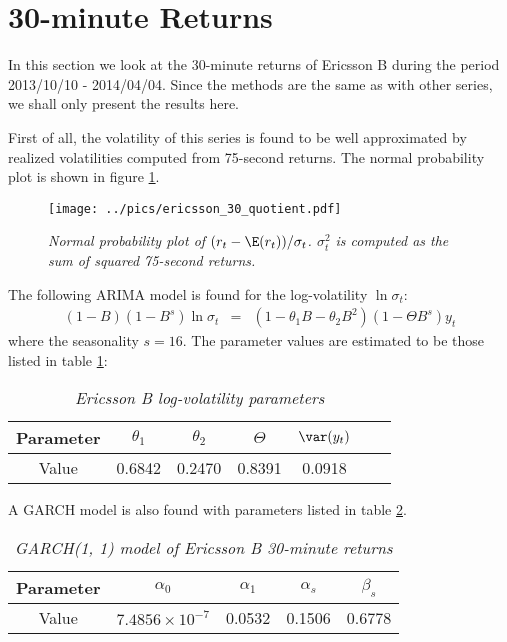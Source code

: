 \section{30-minute Returns}\label{sec:ericsson_30min}
In this section we look at the 30-minute returns of Ericsson B during
the period 2013/10/10 - 2014/04/04. Since the methods are the same as
with other series, we shall only present the results here.

First of all, the volatility of this series is found to be well
approximated by realized volatilities computed from 75-second
returns. The normal probability plot is shown in figure
\ref{fig:ericsson_30_quotient}.
\begin{figure}[htb!]
  \centering
  \texttt{[image: ../pics/ericsson\_30\_quotient.pdf]}
  \caption{\small \it Normal probability plot of $(r_t -\E(r_t))/
    \sigma_t$. $\sigma_t^2$ is computed as the sum of squared
    75-second returns.}
  \label{fig:ericsson_30_quotient}
\end{figure}
The following ARIMA model is found for the log-volatility $\ln
\sigma_t$:
\begin{eqnarray*}
  (1-B)(1-B^s) \ln\sigma_t &=& (1- \theta_1B - \theta_2B^2) (1 -
  \Theta B^s) y_t 
\end{eqnarray*}
where the seasonality $s = 16$. The parameter values are estimated to
be those listed in table
\ref{tab:ericsson_30_params}:
\begin{table}[htb!]
  \centering
  \begin{tabular}{|c|c|c|c|c|c|c|}
    \hline
    Parameter & $\theta_1$ & $\theta_2$ & $\Theta$ &
    $\var(y_t)$ \\
    \hline
    Value & 0.6842 & 0.2470 & 0.8391 & 0.0918 \\
    \hline
  \end{tabular}
  \caption{\small \it Ericsson B log-volatility parameters}
  \label{tab:ericsson_30_params}
\end{table}
A GARCH model is also found with parameters listed in table
\ref{tab:ericsson_30_garch_params}.
\begin{table}[htb!]
  \centering
  \begin{tabular}{|c|c|c|c|c|}
    \hline
    Parameter & $\alpha_0$ & $\alpha_1$ & $\alpha_{s}$ & $\beta_{s}$ \\
    \hline
    Value & $7.4856 \times 10^{-7}$ & 0.0532 & 0.1506 & 0.6778 \\
    \hline
  \end{tabular}
  \caption{\small \it GARCH(1, 1) model of Ericsson B 30-minute
    returns}
  \label{tab:ericsson_30_garch_params}
\end{table}

